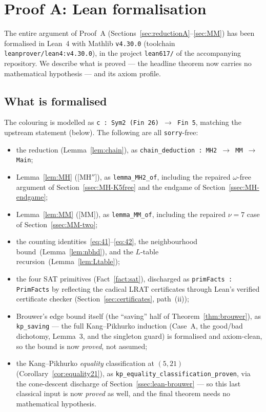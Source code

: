 \documentclass[11pt,reqno]{amsart}
\theoremstyle{definition}
\theoremstyle{remark}
\begin{document}
\section{Proof A: Lean formalisation}\label{sec:lean}

The entire argument of Proof~A (Sections~\ref{sec:reductionA}--\ref{sec:MM}) has been
formalised in Lean~4 with Mathlib \texttt{v4.30.0} (toolchain
\texttt{leanprover/lean4:v4.30.0}), in the project \texttt{lean617/} of the
accompanying repository. We describe what is proved --- the headline theorem now
carries no mathematical hypothesis --- and its axiom profile.

\subsection{What is formalised}
The colouring is modelled as \texttt{c : Sym2 (Fin 26) $\to$ Fin 5}, matching the
upstream statement (below). The following are all \texttt{sorry}-free:
\begin{itemize}[nosep]
\item the reduction (Lemma~\ref{lem:chain}), as \texttt{chain\_deduction : MH2 $\to$
MM $\to$ Main};
\item Lemma~\ref{lem:MH} (\textsf{[MH$''$]}), as \texttt{lemma\_MH2\_of}, including the
repaired $\omega$-free argument of Section~\ref{ssec:MH-K5free} and the endgame of
Section~\ref{ssec:MH-endgame};
\item Lemma~\ref{lem:MM} (\textsf{[MM]}), as \texttt{lemma\_MM\_of}, including the
repaired $\nu=7$ case of Section~\ref{ssec:MM-two};
\item the counting identities~\eqref{eq:41}--\eqref{eq:42}, the neighbourhood
bound~(Lemma~\ref{lem:nbhd}), and the $L$-table recursion~(Lemma~\ref{lem:Ltable});
\item the four SAT primitives (Fact~\ref{fact:sat}), discharged as
\texttt{primFacts : PrimFacts} by reflecting the cadical LRAT certificates through
Lean's verified certificate checker (Section~\ref{sec:certificates}, path~(ii));
\item Brouwer's edge bound itself (the ``saving'' half of Theorem~\ref{thm:brouwer}),
as \texttt{kp\_saving} --- the full Kang--Pikhurko induction (Case~A, the good/bad
dichotomy, Lemma~3, and the singleton guard) is formalised and axiom-clean, so the
bound is now \emph{proved}, not assumed;
\item the Kang--Pikhurko \emph{equality} classification at $(5,21)$
(Corollary~\ref{cor:equality21}), as
\texttt{kp\_equality\_\allowbreak classification\_\allowbreak proven}, via
the cone-descent discharge of Section~\ref{ssec:lean-brouwer} --- so this last classical
input is now \emph{proved} as well, and the final theorem needs no mathematical
hypothesis.
\end{itemize}
\end{document}
